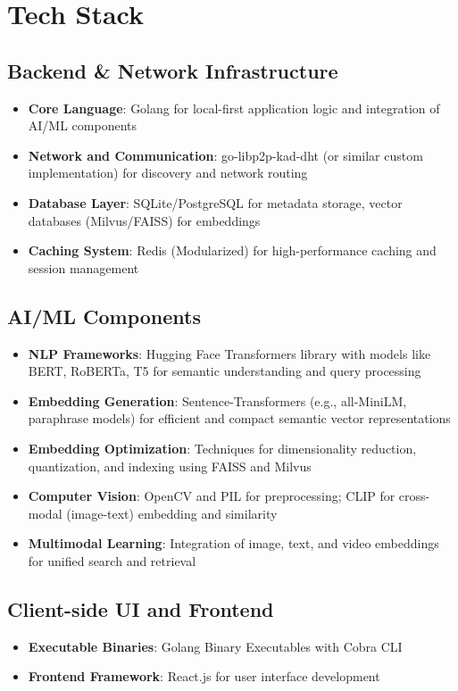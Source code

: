 \documentclass[11pt,a4paper]{article}
\begin{document}
\section{Tech Stack}

\subsection{Backend \& Network Infrastructure}
\begin{itemize}
    \item \textbf{Core Language}: Golang for local-first application logic and integration of AI/ML components
    \item \textbf{Network and Communication}: go-libp2p-kad-dht (or similar custom implementation) for discovery and network routing
    \item \textbf{Database Layer}: SQLite/PostgreSQL for metadata storage, vector databases (Milvus/FAISS) for embeddings
    \item \textbf{Caching System}: Redis (Modularized) for high-performance caching and session management
\end{itemize}

\subsection{AI/ML Components}
\begin{itemize}
    \item \textbf{NLP Frameworks}: Hugging Face Transformers library with models like BERT, RoBERTa, T5 for semantic understanding and query processing
    \item \textbf{Embedding Generation}: Sentence-Transformers (e.g., all-MiniLM, paraphrase models) for efficient and compact semantic vector representations
    \item \textbf{Embedding Optimization}: Techniques for dimensionality reduction, quantization, and indexing using FAISS and Milvus
    \item \textbf{Computer Vision}: OpenCV and PIL for preprocessing; CLIP for cross-modal (image-text) embedding and similarity
    \item \textbf{Multimodal Learning}: Integration of image, text, and video embeddings for unified search and retrieval
\end{itemize}

\subsection{Client-side UI and Frontend}
\begin{itemize}
    \item \textbf{Executable Binaries}: Golang Binary Executables with Cobra CLI
    \item \textbf{Frontend Framework}: React.js for user interface development
\end{itemize}
\end{document}
